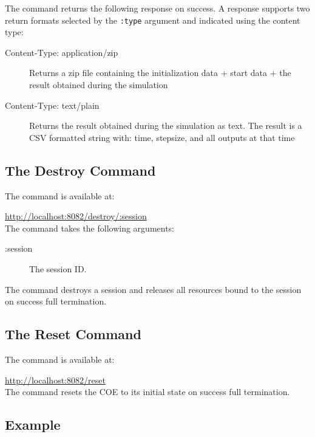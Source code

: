	\noindent The command returns the following response on success.
	A response supports two return formats selected by the \texttt{:type} argument and indicated using the content type:
	\begin{description}
		\item[Content-Type: application/zip] Returns a zip file containing the initialization data + start data + the result obtained during the simulation
		\item[Content-Type: text/plain] Returns the result obtained during the simulation as text. The result is a CSV formatted string with: time, stepsize, and all outputs at that time
	\end{description}
	\subsection{The Destroy Command}
	The command is available at:
	
	\url{http://localhost:8082/destroy/:session}\\
	
	\noindent The command takes the following arguments:
	
	\begin{description}
		\item[:session] The session ID.
	\end{description}
	
	\noindent The command destroys a session and releases all resources bound to the session on success full termination.
	\subsection{The Reset Command}
	The command is available at:
	
	\url{http://localhost:8082/reset}\\
	
	\noindent The command resets the COE to its initial state on success full termination.
	
	\subsection{Example}\label{subsec:example}
	
